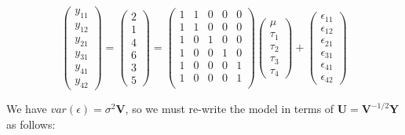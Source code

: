 \documentclass[11pt]{article}
\begin{document}
\[
\begin{pmatrix}
y_{11} \\ y_{12}\\ y_{21}\\ y_{31}\\ y_{41}\\ y_{42}
\end{pmatrix} = 
\begin{pmatrix} 
2\\ 1\\ 4\\ 6\\ 3\\ 5
\end{pmatrix} = 
\begin{pmatrix}
1 & 1 & 0 & 0 & 0 \\
1 & 1 & 0 & 0 & 0 \\
1 & 0 & 1 & 0 & 0 \\
1 & 0 & 0 & 1 & 0 \\
1 & 0 & 0 & 0 & 1 \\
1 & 0 & 0 & 0 & 1 \\
\end{pmatrix}  
\begin{pmatrix}
\mu \\ \tau_1 \\ \tau_2 \\ \tau_3 \\ \tau_4 
\end{pmatrix} + 
\begin{pmatrix}
\epsilon_{11} \\ \epsilon_{12}\\ \epsilon_{21}\\ \epsilon_{31}\\ \epsilon_{41}\\ \epsilon_{42}
\end{pmatrix}
\]

We have $var(\epsilon) = \sigma^2 \mathbf{V}$, so we must re-write
the model in terms of $\mathbf{U} = \mathbf{V}^{-1/2}\mathbf{Y}$ as
follows:
\end{document}
